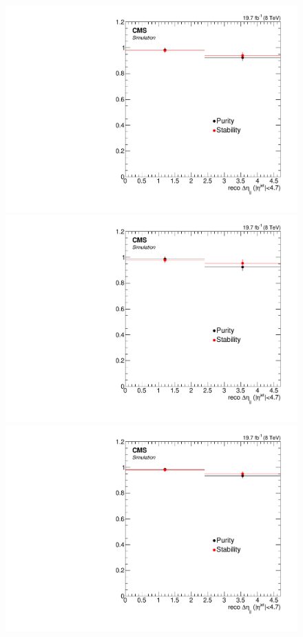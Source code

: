 \begin{figure}[hbtp]
  \begin{center}
    \includegraphics[width=0.8\cmsFigWidth]{Figures/Unfolding/BinMigration/PurityStability_4m_Deta_Mad}
    \includegraphics[width=0.8\cmsFigWidth]{Figures/Unfolding/BinMigration/PurityStability_4e_Deta_Mad}
    \includegraphics[width=0.8\cmsFigWidth]{Figures/Unfolding/BinMigration/PurityStability_2e2m_Deta_Mad}

\end{center}
\end{figure}
